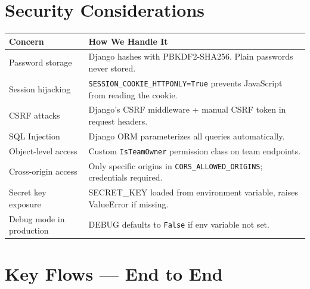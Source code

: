 \documentclass[12pt,a4paper]{article}
\begin{document}
\section{Security Considerations}

\begin{center}
\begin{tabularx}{\textwidth}{lX}
\toprule
\textbf{Concern} & \textbf{How We Handle It} \\
\midrule
Password storage & Django hashes with PBKDF2-SHA256. Plain passwords never stored. \\
Session hijacking & \texttt{SESSION\_COOKIE\_HTTPONLY=True} prevents JavaScript from reading the cookie. \\
CSRF attacks & Django's CSRF middleware + manual CSRF token in request headers. \\
SQL Injection & Django ORM parameterizes all queries automatically. \\
Object-level access & Custom \texttt{IsTeamOwner} permission class on team endpoints. \\
Cross-origin access & Only specific origins in \texttt{CORS\_ALLOWED\_ORIGINS}; credentials required. \\
Secret key exposure & SECRET\_KEY loaded from environment variable, raises ValueError if missing. \\
Debug mode in production & DEBUG defaults to \texttt{False} if env variable not set. \\
\bottomrule
\end{tabularx}
\end{center}


\section{Key Flows — End to End}
\end{document}
